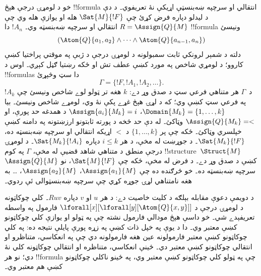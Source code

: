 \documentclass[../../../include/open-logic-section]{subfiles}
\begin{document}
خو د لومړۍ درجې هېڅ !!{formula} انتقالي او سرچپه ښه‌بنسټې
اړيکې نۀ تعريفوي۔ د دې د ليدلو دپاره فرض کړئ چې
$\Sat{M}{!F}$ هله او يوازې هله وي چې $R =
\Assign{Q}{M}$ انتقالي او سرچپه ښه‌بنسټه وي۔ $!A_n$ دا
!!{formula} ونيسئ
\[
(\Atom{Q}{a_1,a_2} \land \dots \land
    \Atom{Q}{a_{n-1},a_{n}})
\]
دلته د شمېر لرونکي ثابت سمبولونه د لومړۍ درجې د ژبې په موقتي
پراختيا کښې کاروو؛ د لومړي شاخص په مورد کښې عطف تش او ځکه رښتيا
ګڼل کېږي۔
اوس د !!{formula}s دا سټ وڅېړئ
\[
\Gamma = \{!F, !A_1, !A_2, \dots\}.
\]
د~$\Gamma$ هر متناهي فرعي سټ د صدق وړ دے: $k$ هغه تر ټولو لوے
شاخص ونيسئ چې $!A_k$ په فرعي سټ کښې وي؛ که د لړۍ هېڅ غړے پکې
نۀ وي، لومړے شاخص ونيسئ۔ بيا $\Domain{M_k} = \{1, \dots, k\}$،
$\Assign{a_i}{M_k} = i$ د همدغه حد پورې، او
$\Assign{Q}{M_k} = <$ وټاکئ۔ له دې حد څخه د پورته ثابتونو ارزښتونه
په دامنه کښې خپلسري وټاکئ۔ ځکه چې پر $\{1,
\dots, k\}$ د $<$ اړيکه انتقالي او سرچپه ښه‌بنسټه ده،
$\Sat{M_k}{!F}$۔ د جوړښت له مخې، د هر $i \le k$ دپاره
$\Sat{M_k}{!A_i}$۔
د لومړۍ درجې منطق د متناهي شاهد قضيې له مخې، $\Gamma$ په
کوم !!{structure}~$\Struct{M}$ کښې د صدق وړ دے۔ د فرض له مخې،
ځکه چې $\Sat{M}{!F}$، نو $\Assign{Q}{M}$ سرچپه
ښه‌بنسټه ده۔ خو څرګنده ده چې $\Assign{a_1}{M}$،
$\Assign{a_2}{M}$، \dots{} به هغه نامتناهي لړۍ جوړه کړي
چې سرچپه ښه‌بنسټوالی ئې ردوي۔

د دويمې دعوې مقابله بېلګه د کليت خاصيت دے: د هر $u$ او $v$
دپاره $Ruv$۔ کلي چوکاټونه د لومړۍ درجې د
$\lforall[x][\lforall[y][\Atom{Q}{x,y}]]$ فارمول په واسطه
تعريفېدے شي۔ خو داسې هېڅ مودالي فارمول نشته چې په ټولو او يوازې
کلي چوکاټونو کښې معتبر وي۔ دا د يوې په خپل ذات کښې په زړه پورې
پايلې نتيجه ده: په کلي چوکاټونو کښې معتبر فارمولونه عين هغه
فارمولونه دي چې په انعکاسي، متناظرو او انتقالي چوکاټونو کښې
معتبر دي۔ ځينې انعکاسي، متناظره او انتقالي چوکاټونه کلي
نۀ دي؛ نو هر !!{formula} چې په ټولو کلي چوکاټونو کښې معتبر وي،
په ځينو ناکلي چوکاټونو کښې هم معتبر وي۔
\end{document}
